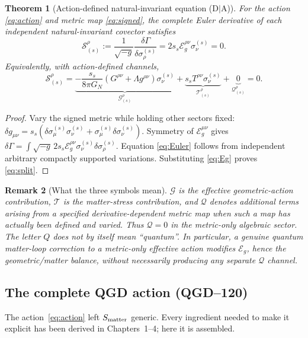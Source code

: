 \documentclass[11pt,a4paper]{article}
\newtheorem{theorem}{Theorem}[section]
\newtheorem{remark}[theorem]{Remark}
\newcommand{\cE}{\mathcal E}
\newcommand{\cG}{\mathscr G}
\newcommand{\cT}{\mathscr T}
\newcommand{\cQ}{\mathscr Q}
\newcommand{\cS}{\mathscr S}
\begin{document}
\begin{theorem}[Action-defined natural-invariant equation (D$\mid$A)]
\label{thm:projection}
For the action \eqref{eq:action} and metric map \eqref{eq:signed},
the complete Euler derivative of each independent natural-invariant
covector satisfies
\begin{equation}\label{eq:Euler}
\boxed{\cS_{(s)}^\rho
:=\frac1{\sqrt{-g}}\frac{\delta\Gamma}
{\delta\sigma^{(s)}_\rho}
=2s_s\cE_g^{\rho\nu}\sigma^{(s)}_\nu=0.}
\end{equation}
Equivalently, with \emph{action-defined} channels,
\begin{equation}\label{eq:split}
\boxed{\cS_{(s)}^\rho
=\underbrace{-\frac{s_s}{8\pi G_N}
\left(G^{\rho\nu}+\Lambda g^{\rho\nu}\right)
\sigma^{(s)}_\nu}_{\displaystyle\cG_{(s)}^\rho}
+\underbrace{s_s T^{\rho\nu}\sigma^{(s)}_\nu}
_{\displaystyle\cT_{(s)}^\rho}
+\underbrace{0}_{\displaystyle\cQ_{(s)}^\rho}=0.}
\end{equation}
\end{theorem}
\begin{proof}
Vary the signed metric while holding other sectors fixed:
$\delta g_{\mu\nu}=s_s(\delta\sigma^{(s)}_\mu
\sigma^{(s)}_\nu+\sigma^{(s)}_\mu\delta\sigma^{(s)}_\nu)$.
Symmetry of $\cE_g^{\mu\nu}$ gives
$\delta\Gamma=\int\sqrt{-g}\,2s_s\cE_g^{\rho\nu}
\sigma^{(s)}_\nu\delta\sigma^{(s)}_\rho$.
Equation \eqref{eq:Euler} follows from independent arbitrary
compactly supported variations. Substituting \eqref{eq:Eg}
proves \eqref{eq:split}.
\end{proof}

\begin{remark}[What the three symbols mean]
$\cG$ is the effective \emph{geometric-action contribution}, $\cT$
is the \emph{matter-stress contribution}, and $\cQ$ denotes additional
terms arising from a \emph{specified} derivative-dependent metric map
when such a map has actually been defined and varied. Thus $\cQ=0$
in the metric-only algebraic sector. The letter $Q$ does \emph{not}
by itself mean ``quantum''. In particular, a genuine quantum
matter-loop correction to a metric-only effective action modifies
$\cE_g$, hence the geometric/matter balance, without necessarily
producing any separate $\cQ$ channel.
\end{remark}


\subsection{The complete QGD action (QGD--120)}\label{sec:qgdaction}
The action~\eqref{eq:action} left $S_{\rm matter}$ generic. Every ingredient needed to
make it explicit has been derived in Chapters~1--4; here it is assembled.
\end{document}
